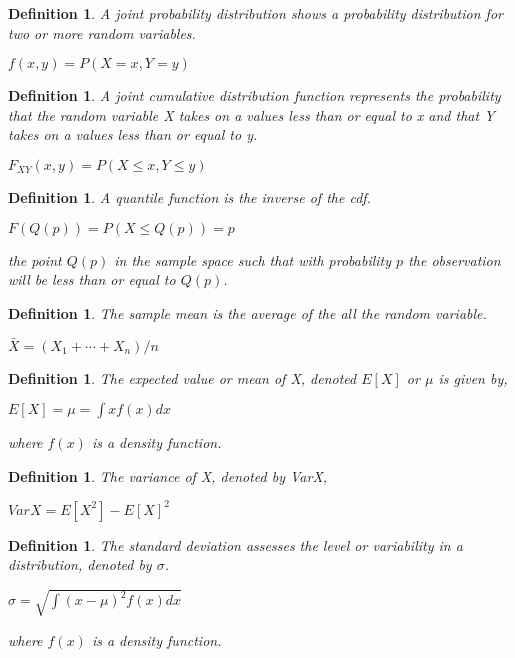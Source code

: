 \documentclass[11pt,a4paper]{article}
\theoremstyle{plain}
\newtheorem{de}[fact]{Definition}
\begin{document}
\newpage
\begin{de}
A joint probability distribution shows a probability distribution for two or more random variables.
\begin{center}
$f(x,y)=P(X=x,Y=y)$
\end{center}
\end{de}


\begin{de}
A joint cumulative distribution function represents the probability that the random variable X takes on a values less than or equal to x and that Y takes on a values less than or equal to y.
\begin{center}
$F_{XY}(x,y)=P(X\leq x, Y \leq y)$
\end{center}
\end{de}

\begin{de}
A quantile function is the inverse of the cdf.
\begin{center}
$F(Q(p))=P(X \leq Q(p))=p$
\end{center}
the point $Q(p)$ in the sample space such that with probability $p$ the observation will be less than or equal to $Q(p)$.  
\end{de}

\begin{de}
The sample mean is the average of the all the random variable. 
\begin{center}
$\bar{X}=(X_1+\cdots+X_n)/n$
\end{center}
\end{de}

\begin{de}
The expected value or mean of X, denoted $E[X]$ or $\mu$ is given by,
\begin{center}
$E[X]= \mu= \int xf(x)dx$
\end{center}
where $f(x)$ is a density function.
\end{de}


\begin{de}
The variance of X, denoted by VarX,
\begin{center}
$VarX=E[X^2]-E[X]^2$
\end{center}
\end{de}

\begin{de}
The standard deviation assesses the level or variability in a distribution, denoted by $\sigma$.
\begin{center}
$\sigma = \sqrt{\int (x- \mu)^2f(x)dx}$
\end{center}
where $f(x)$ is a density function.
\end{de}
\end{document}
